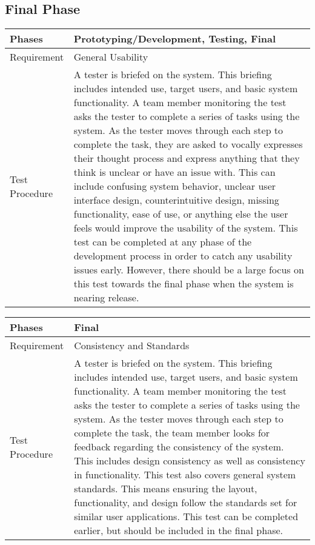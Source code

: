 \documentclass{article}
\begin{document}
\subsection{Final Phase}
\begin{tabular}{| l | p{12cm}  |}
    \hline
	Phases & Prototyping/Development, Testing, Final \\ \hline
	Requirement & General Usability \\ \hline
	Test Procedure & A tester is briefed on the system. This briefing includes
	intended use, target users, and basic system functionality. A team member
	monitoring the test asks the tester to complete a series of tasks using
	the system. As the tester moves through each step to complete the task,
	they are asked to vocally expresses their thought process and express
	anything that they think is unclear or have an issue with. This can
	include confusing system behavior, unclear user interface design,
	counterintuitive design, missing functionality, ease of use, or anything
	else the user feels would improve the usability of the system. This test
	can be completed at any phase of the development process in order to catch
	any usability issues early. However, there should be a large focus on this
	test towards the final phase when the system is nearing release. \\ \hline
\end{tabular}

\begin{tabular}{| l | p{12cm}  |}
    \hline
	Phases & Final \\ \hline
	Requirement & Consistency and Standards \\ \hline
	Test Procedure & A tester is briefed on the system. This briefing includes
	intended use, target users, and basic system functionality. A team member
	monitoring the test asks the tester to complete a series of tasks using
	the system. As the tester moves through each step to complete the task,
	the team member looks for feedback regarding the consistency of the
	system. This includes design consistency as well as consistency in
	functionality. This test also covers general system standards. This means
	ensuring the layout, functionality, and design follow the standards set
	for similar user applications. This test can be completed earlier, but
	should be included in the final phase.  \\ \hline
\end{tabular}
\end{document}
